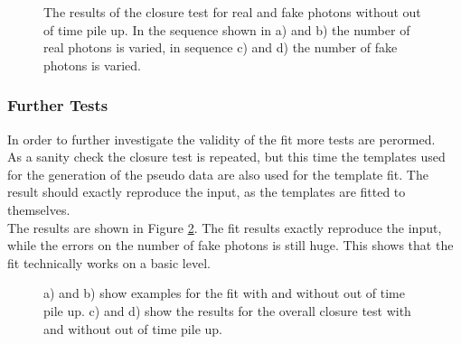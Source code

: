\begin{figure}[ht]
  \caption{The results of the closure test for real and fake photons without out of time pile up. In the sequence shown in a) and b) the number of real photons is varied, in sequence c) and d) the number of fake photons is varied.}
  \label{fig_ttg_clo_seqoot}
\end{figure}

\subsubsection{Further Tests}

In order to further investigate the validity of the fit more tests are perormed.\\
As a sanity check the closure test is repeated, but this time the templates used for the generation of the pseudo data are also used for the template fit. The result should exactly reproduce the input, as the templates are fitted to themselves.\\
The results are shown in Figure \ref{fig_ttg_clo_toy}. The fit results exactly reproduce the input, while the errors on the number of fake photons is still huge. This shows that the fit technically works on a basic level.\\

\begin{figure}[ht]
  \caption{a) and b) show examples for the fit with and without out of time pile up. c) and d) show the results for the overall closure test with and without out of time pile up.}
  \label{fig_ttg_clo_toy}
\end{figure}

